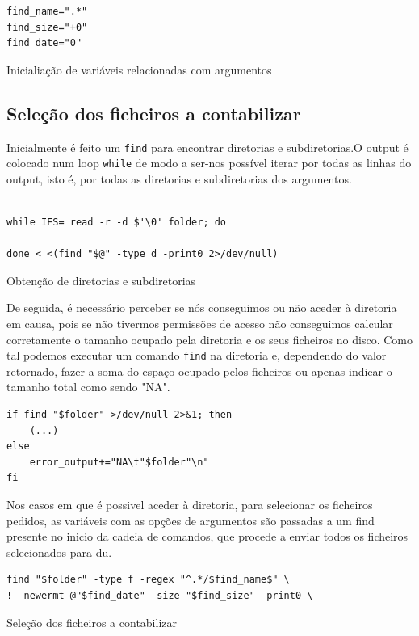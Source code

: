 \begin{listing}[H]
\begin{verbatim}
find_name=".*"
find_size="+0"
find_date="0"
\end{verbatim}
\caption{Inicialiação de variáveis relacionadas com
argumentos}
\end{listing}
\subsection{Seleção dos ficheiros a contabilizar}
Inicialmente é feito um \verb|find| para encontrar
diretorias e subdiretorias.O output é colocado num loop
\verb|while| de modo a ser-nos possível iterar por todas as
linhas do output, isto é, por todas as diretorias e
subdiretorias dos argumentos.
\begin{listing}[H]
\begin{verbatim}

while IFS= read -r -d $'\0' folder; do 

done < <(find "$@" -type d -print0 2>/dev/null)
\end{verbatim}
\caption{Obtenção de diretorias e subdiretorias}
\end{listing}
De seguida, é necessário perceber se nós conseguimos ou não
aceder à diretoria em causa, pois se não tivermos permissões
de acesso não conseguimos calcular corretamente o tamanho
ocupado pela diretoria e os seus ficheiros no disco. Como
tal podemos executar um comando \verb|find| na diretoria
e, dependendo do valor retornado, fazer a soma do espaço
ocupado pelos ficheiros ou apenas indicar o tamanho total
como sendo "NA".
\begin{listing}[H]
\begin{verbatim}
if find "$folder" >/dev/null 2>&1; then
    (...)
else
    error_output+="NA\t"$folder"\n"
fi
\end{verbatim}
\end{listing}
Nos casos em que é possivel aceder à diretoria, para
selecionar os ficheiros pedidos, as variáveis com as opções
de argumentos são passadas a um find presente no inicio da cadeia de comandos,
que procede a enviar todos os ficheiros selecionados para
du.
\begin{listing}[H]
\begin{verbatim}
find "$folder" -type f -regex "^.*/$find_name$" \
! -newermt @"$find_date" -size "$find_size" -print0 \
\end{verbatim}
\caption{Seleção dos ficheiros a contabilizar}
\end{listing}
